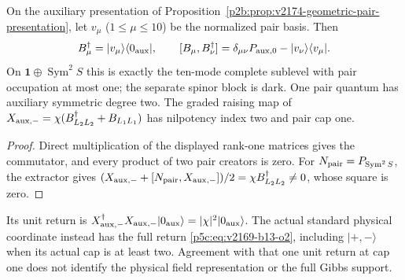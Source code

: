 \documentclass[12pt,a4paper]{article}
\begin{document}
\begin{lemma}
\label{p4:lem:v2174-aux-pair-boundary}
On the auxiliary presentation of
Proposition~\ref{p2b:prop:v2174-geometric-pair-presentation}, let
$v_\mu$ ($1\le\mu\le10$) be the normalized pair basis. Then
\[
 B_\mu^\dagger=|v_\mu\rangle\langle0_{\rm aux}|,
 \qquad [B_\mu,B_\nu^\dagger]
     =\delta_{\mu\nu}P_{{\rm aux},0}
                         -|v_\nu\rangle\langle v_\mu|.
\]
On $\mathbf1\oplus\operatorname{Sym}^2S$ this is exactly the ten-mode
complete sublevel with pair occupation at most one; the separate spinor
block is dark. One pair quantum has auxiliary symmetric degree two.
The graded raising map of
$X_{{\rm aux},-}=\chi(B_{L_2L_2}^\dagger+B_{L_1L_1})$ has nilpotency
index two and pair cap one.
\end{lemma}
\begin{proof}
Direct multiplication of the displayed rank-one matrices gives the
commutator, and every product of two pair creators is zero.
For $N_{\rm pair}=P_{\operatorname{Sym}^2S}$, the extractor gives
$(X_{{\rm aux},-}+[N_{\rm pair},X_{{\rm aux},-}])/2
=\chi B_{L_2L_2}^\dagger\ne0$, whose square is zero.
\end{proof}
Its unit return is $X_{{\rm aux},-}^\dagger X_{{\rm aux},-}
|0_{\rm aux}\rangle=|\chi|^2|0_{\rm aux}\rangle$.
The actual standard physical coordinate instead has the full return
\eqref{p5c:eq:v2169-b13-o2}, including $|+,-\rangle$ when its actual cap
is at least two. Agreement with that one unit return at cap one does not
identify the physical field representation or the full Gibbs support.
\end{document}
